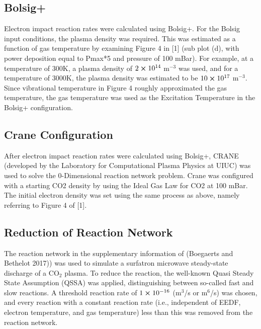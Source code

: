 \documentclass[twocolumn,10pt,a4paper]{article}
\begin{document}
\subsection{Bolsig+}
Electron impact reaction rates were calculated using Bolsig+.
For the Bolsig input conditions, the plasma density was required.
This was estimated as a function of gas temperature by examining Figure 4 in
[1] (sub plot (d), with power deposition equal to Pmax*5 and pressure of 100
mBar). For example, at a temperature of 300K, a plasma density of $2 \cross 10^{14}$
m$^{-3}$ was used, and for a temperature of 3000K, the plasma density was estimated to be
$10 \cross 10^{17}$  m$^{-3}$. Since vibrational temperature in Figure 4 roughly
approximated the gas temperature, the gas temperature was used as the Excitation
Temperature in the Bolsig+ configuration.

\subsection{Crane Configuration}
After electron impact reaction rates were calculated using Bolsig+, CRANE
(developed by the Laboratory for Computational Plasma Physics at UIUC) was used
to solve the 0-Dimensional reaction network problem. Crane was configured with a starting
CO2 density by using the Ideal Gas Law for CO2 at 100 mBar. The initial electron
density was set using the same process as above, namely referring to Figure 4
of [1].


\subsection{Reduction of Reaction Network}
The reaction network in the supplementary information of (Boegaerts and Bethelot 2017))
was used to simulate
a surfatron microwave steady-state discharge of a CO$_2$ plasma. To reduce the reaction,
the well-known Quasi Steady State Assumption (QSSA) was
applied, distinguishing between so-called fast and slow reactions. A threshold
reaction rate of $1 \cross 10^{-16}$ (m$^{3}$/s or m$^{6}$/s) was chosen, and
every reaction with a constant reaction rate (i.e., independent of EEDF,
electron temperature, and gas temperature) less than this was removed from
the reaction network.
\end{document}
